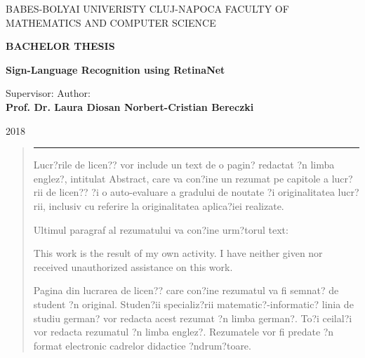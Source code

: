 \documentclass[a4paper, 12pt,english]{report}
\renewcommand{\headrulewidth}{0.2pt}
\renewcommand{\footrulewidth}{0.2pt}
\begin{document}
\begin{titlepage}

	\begin{center}
		\Large{{BABES-BOLYAI UNIVERISTY CLUJ-NAPOCA}}
		\Large{{FACULTY OF MATHEMATICS AND COMPUTER SCIENCE}}
		
		\vspace{8cm}
		
		\textbf{BACHELOR THESIS}
		
		\vspace{1cm}
		\Huge\textbf{{Sign-Language Recognition using RetinaNet}}
		\fontsize{12}{14}
		
	\end{center}
	\vspace{6cm}
	
	\hspace*{0.8cm}Supervisor: \hfill  Author: \hspace*{0.8cm} \\    
	\textbf{Prof. Dr. Laura Diosan  \hfill  \textbf{Norbert-Cristian Bereczki}}
	
	\vspace{2cm}
	\begin{center}
		\Large{2018}
	\end{center}
\end{titlepage}  
    
    
\newpage
\thispagestyle{empty}
\mbox{}
\newpage
{} 

\renewcommand{\headrulewidth}{0pt}
\renewcommand{\footrulewidth}{0pt}
\cleardoublepage
\begin{abstract}
\vspace{0.5cm}	
\hrule
\vspace{0.5cm}	

Lucr?rile de licen?? vor include un text de o pagin? redactat ?n limba englez?, intitulat Abstract, care va con?ine un rezumat pe capitole a lucr?rii de licen?? ?i o auto-evaluare a gradului de noutate ?i originalitatea lucr?rii, inclusiv cu referire la originalitatea aplica?iei realizate. 

Ultimul paragraf al rezumatului va con?ine urm?torul text: 

This work is the result of my own activity. I have neither given nor received unauthorized assistance on this work. 

Pagina din lucrarea de licen?? care con?ine rezumatul va fi semnat? de student ?n original. Studen?ii specializ?rii matematic?-informatic? linia de studiu german? vor redacta acest rezumat ?n limba german?. To?i ceilal?i vor redacta rezumatul ?n limba englez?. Rezumatele vor fi predate ?n format electronic cadrelor didactice ?ndrum?toare.

\end{abstract}
\tableofcontents
           
\end{document}

